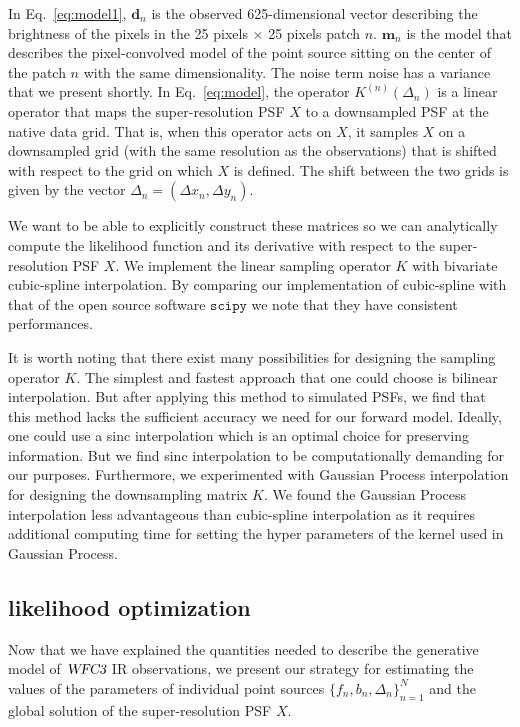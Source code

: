 In Eq.~\ref{eq:model1}, $\mathbf{d}_{n}$ is the observed 625-dimensional vector describing the brightness of the pixels in the 25 pixels $\times$ 25 pixels patch $n$. 
$\mathbf{m}_{n}$ is the model that describes the pixel-convolved model of the point source sitting on the center of the patch $n$ with the same dimensionality. The 
noise term $\mathrm{noise}$ has a variance that we present shortly.
In Eq.~\ref{eq:model}, the operator $K^{(n)}(\Delta_n)$ is a linear operator that maps the super-resolution PSF $X$ to a downsampled PSF at the native 
data grid. That is, when this operator acts on $X$, it samples $X$ on a downsampled grid (with the same resolution as the observations) 
that is shifted with respect to the grid on which $X$ is defined. The shift between the two grids is given by the vector $\Delta_n = (\Delta x_n , \Delta y_n)$.


We want to be able to explicitly construct these matrices so we can analytically compute the likelihood function and its derivative with respect to the super-resolution PSF $X$. 
We implement the linear sampling operator $K$ with bivariate cubic-spline interpolation. By comparing our implementation of cubic-spline with that of the open source 
software $\mathtt{scipy}$ we note that they have consistent performances.

It is worth noting that there exist many possibilities for designing the sampling operator $K$.  The simplest and fastest approach that one could 
choose is bilinear interpolation. But after applying this method to simulated PSFs, we find that this method lacks the sufficient accuracy we 
need for our forward model. Ideally, one could use a sinc interpolation \citep{bickerton,galsim} which is an optimal choice for preserving information.
But we find sinc interpolation to be computationally demanding for our purposes. Furthermore, we experimented with Gaussian Process interpolation for designing the downsampling matrix $K$. We found the Gaussian Process interpolation less advantageous than cubic-spline interpolation as it requires additional computing time for setting the hyper parameters of the kernel used in Gaussian Process.

\subsection{likelihood optimization}

Now that we have explained the quantities needed to describe the generative model of ${\textsl{WFC3}}$ IR observations, we 
present our strategy for estimating the values of the parameters of individual point sources $\{f_{n},b_{n},\Delta_{n}\}_{n=1}^{N}$ and 
the global solution of the super-resolution PSF $X$.


